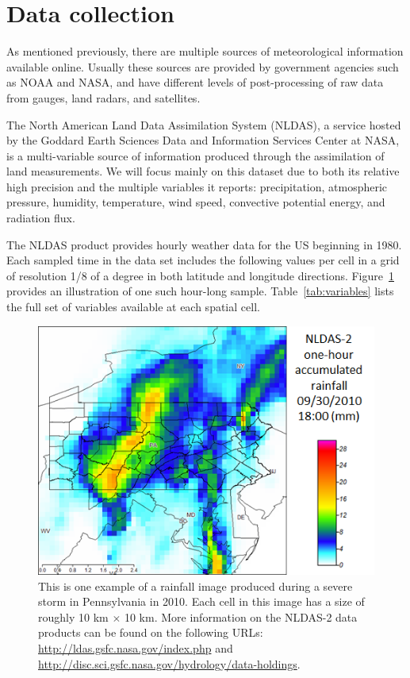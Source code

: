 \documentclass{article}
\begin{document}
\section{Data collection}

As mentioned previously, there are multiple sources of meteorological
information available online. Usually these sources are provided by government
agencies such as NOAA and NASA, and have different levels of post-processing of
raw data from gauges, land radars, and satellites.

The North American Land Data Assimilation System (NLDAS), a service hosted by
the Goddard Earth Sciences Data and Information Services Center at NASA, is a
multi-variable source of information produced through the assimilation of land
measurements. We will focus mainly on this dataset due to both its relative high
precision and the multiple variables it reports: precipitation, atmospheric
pressure, humidity, temperature, wind speed, convective potential energy, and
radiation flux.

The NLDAS product provides hourly weather data for the US beginning in 1980.
Each sampled time in the data set includes the following values per cell in a
grid of resolution 1/8 of a degree in both latitude and longitude directions.
Figure~\ref{fig:example_rainfall} provides an illustration of one such hour-long
sample. Table~\ref{tab:variables} lists the full set of variables available at
each spatial cell.

\begin{figure}[ht] \vskip 0.2in
\begin{center}
\centerline{\includegraphics[bb=0 0 487 360, width=\columnwidth]{weather.png}}
\caption{This is one example of a rainfall image produced during a severe storm in Pennsylvania in 2010. Each cell in this image has a size of roughly 10 km $\times$ 10 km. More information on the NLDAS-2 data products can be found on the following URLs: \url{http://ldas.gsfc.nasa.gov/index.php} and \url{http://disc.sci.gsfc.nasa.gov/hydrology/data-holdings}.}
\label{fig:example_rainfall}
\end{center}
\vskip -0.2in
\end{figure}
\end{document}
